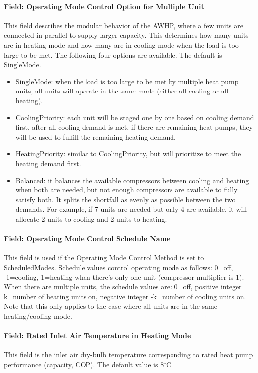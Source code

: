 \paragraph{Field: Operating Mode Control Option for Multiple Unit}
This field describes the modular behavior of the AWHP, where a few units are
connected in parallel to supply larger capacity. This determines how many units
are in heating mode and how many are in cooling mode when the load is too large
to be met. The following four options are available. The default is SingleMode.
\begin{itemize}
    \item SingleMode: when the load is too large to be met by multiple heat pump
units, all units will operate in the same mode (either all cooling or all
heating).
    \item CoolingPriority: each unit will be staged one by one based on cooling
demand first, after all cooling demand is met, if there are remaining heat
pumps, they will be used to fulfill the remaining heating demand.
\item HeatingPriority: similar to CoolingPriority, but will prioritize to meet
  the heating demand first.
\item Balanced: it balances the available compressors between cooling and heating
  when both are needed, but not enough compressors are available to fully
  satisfy both. It splits the shortfall as evenly as possible between the two
  demands. For example, if 7 units are needed but only 4 are available, it will
  allocate 2 units to cooling and 2 units to heating.
\end{itemize}
\paragraph{Field: Operating Mode Control Schedule Name} This field is used if
the Operating Mode Control Method is set to ScheduledModes. Schedule values
control operating mode as follows: 0=off, -1=cooling, 1=heating when there's
only one unit (compressor multiplier is 1). When there are multiple units, the
schedule values are: 0=off, positive integer k=number of heating units on,
negative integer -k=number of cooling units on. Note that this only applies to
the case where all units are in the same heating/cooling mode.
\paragraph{Field: Rated Inlet Air Temperature in Heating Mode} This field is the
inlet air dry-bulb temperature corresponding to rated heat pump performance
(capacity, COP). The default value is 8$^\circ$C.
